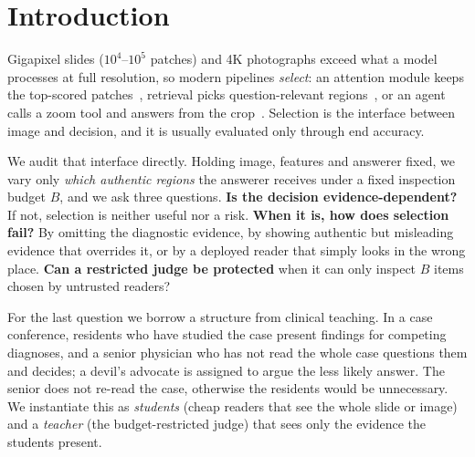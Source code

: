 \documentclass[10pt,twocolumn,letterpaper]{article}
\begin{document}
\section{Introduction}\label{sec:intro}
Gigapixel slides ($10^4$--$10^5$ patches) and 4K photographs exceed what a model processes at full resolution, so modern pipelines \emph{select}: an attention module keeps the top-scored patches~\cite{ilse2018abmil}, retrieval picks question-relevant regions~\cite{beacon2026}, or an agent calls a zoom tool and answers from the crop~\cite{wu2024vstar,zheng2025deepeyes}. Selection is the interface between image and decision, and it is usually evaluated only through end accuracy.

We audit that interface directly. Holding image, features and answerer fixed, we vary only \emph{which authentic regions} the answerer receives under a fixed inspection budget $B$, and we ask three questions. \textbf{Is the decision evidence-dependent?} If not, selection is neither useful nor a risk. \textbf{When it is, how does selection fail?} By omitting the diagnostic evidence, by showing authentic but misleading evidence that overrides it, or by a deployed reader that simply looks in the wrong place. \textbf{Can a restricted judge be protected} when it can only inspect $B$ items chosen by untrusted readers?

For the last question we borrow a structure from clinical teaching. In a case conference, residents who have studied the case present findings for competing diagnoses, and a senior physician who has not read the whole case questions them and decides; a devil's advocate is assigned to argue the less likely answer. The senior does not re-read the case, otherwise the residents would be unnecessary. We instantiate this as \emph{students} (cheap readers that see the whole slide or image) and a \emph{teacher} (the budget-restricted judge) that sees only the evidence the students present.
\end{document}
